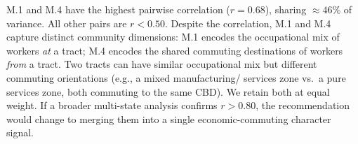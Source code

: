 M.1 and M.4 have the highest pairwise correlation ($r = 0.68$), sharing $\approx 46\%$
of variance. All other pairs are $r < 0.50$.
Despite the correlation, M.1 and M.4 capture distinct community dimensions: M.1
encodes the occupational mix of workers \emph{at} a tract; M.4 encodes the shared
commuting destinations of workers \emph{from} a tract. Two tracts can have similar
occupational mix but different commuting orientations (e.g., a mixed manufacturing/
services zone vs.\ a pure services zone, both commuting to the same CBD).
We retain both at equal weight. If a broader multi-state analysis confirms
$r > 0.80$, the recommendation would change to merging them into a single
economic-commuting character signal.
